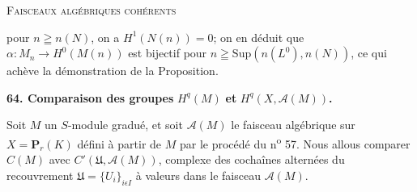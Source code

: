 \begin{center}
\end{center}
 




\textsc{Faisceaux algébriques cohérents}

 pour $n \geqq n(N)$, on a $H^1(N(n)) = 0$; on en déduit que $\alpha : M_n \to H^0(M(n))$ est bijectif pour $n \geqq \mathrm{Sup}(n(L^0), n(N))$, ce qui achève la démonstration de la Proposition.


\textbf{64. Comparaison des groupes} $H^q(M)$ \textbf{et} $H^q(X, \mathcal{A}(M))$\textbf{.}

Soit $M$ un $S$-module gradué, et soit $\mathcal{A}(M)$ le faisceau algébrique sur $X = \mathbf{P}_r(K)$ défini à partir de $M$ par le procédé du n\textsuperscript{o} 57. Nous allous comparer $C(M)$ avec $C'(\mathfrak{U}, \mathcal{A}(M))$, complexe des cochaînes alternées du recouvrement $\mathfrak{U} = \{U_i\}_{i \epsilon I}$ à valeurs dans le faisceau $\mathcal{A}(M)$.

